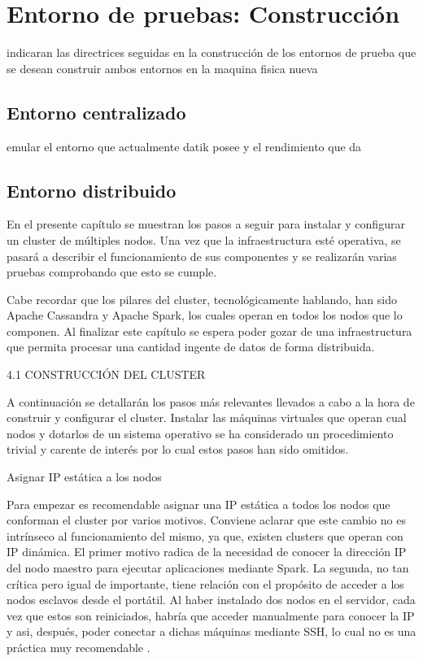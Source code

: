 
\pagestyle{fancy}

\chapter{Entorno de pruebas: Construcción}
\label{entorno_pruebas}

indicaran las directrices seguidas en la construcción de los entornos de prueba que se desean construir
ambos entornos en la maquina fisica nueva

\section{Entorno centralizado}

emular el entorno que actualmente datik posee y el rendimiento que da


\section{Entorno distribuido}

En el presente capítulo se muestran los pasos a seguir para instalar y configurar un cluster de múltiples nodos. Una vez que la infraestructura esté operativa, se pasará a describir el funcionamiento de sus componentes y se realizarán varias pruebas comprobando que esto se cumple. 

Cabe recordar que los pilares del cluster, tecnológicamente hablando, han sido Apache Cassandra y Apache Spark, los cuales operan en todos los nodos que lo componen. Al finalizar este capítulo se espera poder gozar de una infraestructura  que permita procesar una cantidad ingente de datos de forma distribuida.

4.1 CONSTRUCCIÓN DEL CLUSTER

A continuación se detallarán los pasos más relevantes llevados a cabo a la hora de construir y configurar el cluster. Instalar las máquinas virtuales que operan cual nodos y dotarlos de un sistema operativo se ha considerado un procedimiento trivial y carente de interés por lo cual estos pasos han sido omitidos. 

Asignar IP estática a los nodos

Para empezar es recomendable asignar una IP estática a todos los nodos que conforman el cluster por varios motivos. Conviene aclarar que este cambio no es intrínseco al funcionamiento del mismo, ya que, existen clusters que operan con IP dinámica. El primer motivo radica de la necesidad de conocer la dirección IP del nodo maestro para ejecutar aplicaciones mediante Spark. La segunda, no tan crítica pero igual de importante, tiene relación con el propósito de acceder a los nodos esclavos desde el portátil. Al haber instalado dos nodos en el servidor, cada vez que estos son reiniciados, habría que acceder manualmente para conocer la IP y asi, después, poder conectar a dichas máquinas mediante SSH, lo cual no es una práctica muy recomendable .  

